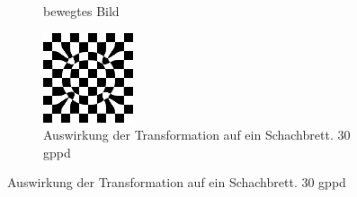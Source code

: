 \begin{figure}[ht]
\begin{subfigure}{0.32\linewidth}
    \caption{bewegtes Bild}
  \end{subfigure}
  \hfill
  \begin{subfigure}{0.32\linewidth}
    \centering
    \includegraphics[width=\linewidth]{images/A4_checkerboard.png}
    \caption{Auswirkung der Transformation auf ein Schachbrett. 30 gppd}
  \end{subfigure}
\end{figure}
\clearpage



